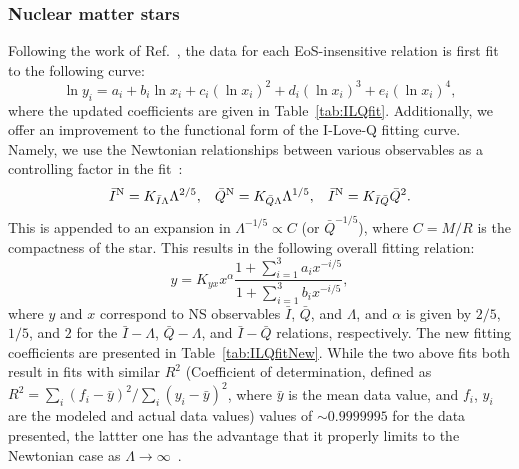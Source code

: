 \documentclass[prd,twocolumn,nofootinbib,superscriptaddress,amsmath,amssymb]{revtex4-1}
\begin{document}
\subsubsection{Nuclear matter stars}\label{sec:ilq-nuc}
Following the work of Ref.~\cite{Yagi:ILQ}, the data for each EoS-insensitive relation is first fit to the following curve:
\begin{equation}\label{eq:ILQfit}
\ln{y_i}=a_i+b_i \ln{x_i} + c_i (\ln{x_i})^2 + d_i (\ln{x_i})^3 + e_i (\ln{x_i})^4,
\end{equation}
where the updated coefficients are given in Table~\ref{tab:ILQfit}.
Additionally, we offer an improvement to the functional form of the I-Love-Q fitting curve. 
Namely, we use the Newtonian relationships between various observables as a controlling factor in the fit~\cite{Yagi:ILQ}:
\begin{equation}\label{eq:Newtonian}
\bar{I}^{\text{N}} = K_{\bar{I}\Lambda}\Lambda^{2/5}, \hspace{3mm} \bar{Q}^{\text{N}} = K_{\bar{Q}\Lambda}\Lambda^{1/5}, \hspace{3mm} \bar{I}^{\text{N}} = K_{\bar{I}\bar{Q}}\bar{Q}^{2}.
\end{equation}
This is appended to an expansion in $\Lambda^{-1/5} \propto C$ (or $\bar{Q}^{-1/5}$), where $C=M/R$ is the compactness of the star.
This results in the following overall fitting relation:
\begin{equation}\label{eq:ILQfitNew}
y=K_{yx} x^{\alpha} \frac{1+\sum_{i=1}^3 a_i x^{-i/5}}{1+\sum_{i=1}^3 b_i x^{-i/5}},
\end{equation}
where $y$ and $x$ correspond to NS observables $\bar{I}$, $\bar{Q}$, and $\Lambda$, and $\alpha$ is given by $2/5$, $1/5$, and $2$ for the $\bar{I}-\Lambda$, $\bar{Q}-\Lambda$, and $\bar{I}-\bar{Q}$ relations, respectively.
The new fitting coefficients are presented in Table~\ref{tab:ILQfitNew}.
While the two above fits both result in fits with similar $R^2$ (Coefficient of determination, defined as $R^2=\sum_i(f_i-\bar{y})^2/\sum_i(y_i-\bar{y})^2$, where $\bar{y}$ is the mean data value, and $f_i$, $y_i$ are the modeled and actual data values) values of $\sim 0.9999995$ for the data presented, the lattter one has the advantage that it properly limits to the Newtonian case as $\Lambda \rightarrow \infty$~\cite{Yagi:binLove}.
\end{document}

